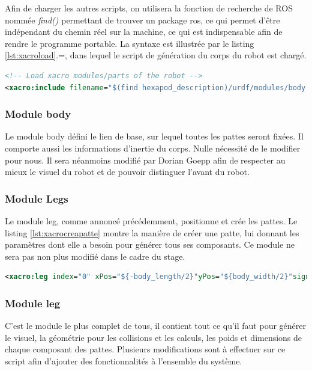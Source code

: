 \documentclass{tnreport}
\begin{document}
Afin de charger les autres scripts, on utilisera la fonction de recherche de ROS nommée \textit{find()} permettant de trouver un package ros, ce qui permet d'être indépendant du chemin réel sur la machine, ce qui est indispensable afin de rendre le programme portable. La syntaxe est illustrée par le listing \ref{lst:xacroload}.=, dans lequel le script de génération du corps du robot est chargé.

\begin{lstlisting}[language=XML,caption={Chargement d'un autre script},label={lst:xacroload}]
<!-- Load xacro modules/parts of the robot -->
<xacro:include filename="$(find hexapod_description)/urdf/modules/body.xacro"/>

\end{lstlisting}

 
\subsubsection{Module body}
Le module body défini le lien de base, sur lequel toutes les pattes seront fixées. Il comporte aussi les informations d'inertie du corps. Nulle nécessité de le modifier pour nous. Il sera néanmoins modifié par Dorian Goepp afin de respecter au mieux le visuel du robot et de pouvoir distinguer l'avant du robot.

\subsubsection{Module Legs}
Le module leg, comme annoncé précédemment, positionne et crée les pattes. Le listing \ref{lst:xacrocreapatte} montre la manière de créer une patte, lui donnant les paramètres dont elle a besoin pour générer tous ses composants. Ce module ne sera pas non plus modifié dans le cadre du stage.
\begin{lstlisting}[language=XML,caption={Création d'une patte},label={lst:xacrocreapatte}]
<xacro:leg index="0" xPos="${-body_length/2}"yPos="${body_width/2}"sign="1"/>
\end{lstlisting}

\subsubsection{Module leg}
C'est le module le plus complet de tous, il contient tout ce qu'il faut pour générer le visuel, la géométrie pour les collisions et les calculs, les poids et dimensions de chaque composant des pattes. Plusieurs modifications sont à effectuer sur ce script afin d'ajouter des fonctionnalités à l'ensemble du système. 
\end{document}
